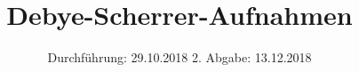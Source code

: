 


\subject{Versuch Nr.41}
\title{Debye-Scherrer-Aufnahmen}
\date{
  Durchführung: 29.10.2018
  \hspace{3em}
  2. Abgabe: 13.12.2018
}




\maketitle
\thispagestyle{plain}
\tableofcontents
\newpage



\newpage

\newpage

\newpage

\newpage

\printbibliography
\newpage
% 


